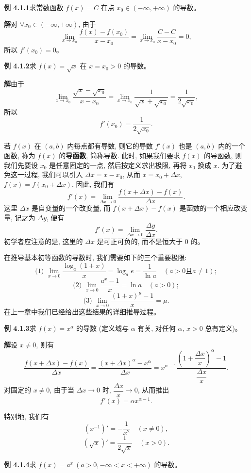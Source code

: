 \documentclass[UTF8,12pt,a4paper,fontset=fandol]{ctexart}
\begin{document}
\noindent\textbf{例 4.1.1}\quad 求常数函数 $f(x)=C$ 在点 $x_0\in(-\infty,+\infty)$ 的导数。

\noindent\textbf{解}\quad 对 $\forall x_0\in(-\infty,+\infty)$, 由于
\[
  \lim_{x\to x_0}\frac{f(x)-f(x_0)}{x-x_0}
  =
  \lim_{x\to x_0}\frac{C-C}{x-x_0}=0,
\]
所以 $f'(x_0)=0$。

\noindent\textbf{例 4.1.2}\quad 求 $f(x)=\sqrt{x}$ 在 $x=x_0>0$ 的导数。

\noindent\textbf{解}\quad 由于
\[
  \lim_{x\to x_0}\frac{\sqrt{x}-\sqrt{x_0}}{x-x_0}
  =
  \lim_{x\to x_0}\frac1{\sqrt{x}+\sqrt{x_0}}
  =
  \frac1{2\sqrt{x_0}},
\]
所以
\[
  f'(x_0)=\frac1{2\sqrt{x_0}}.
\]

若 $f(x)$ 在 $(a,b)$ 内每点都有导数, 则它的导数 $f'(x)$ 也是 $(a,b)$ 内的一个函数, 称为 $f(x)$ 的\textbf{导函数}, 简称导数. 此时, 如果我们要求 $f(x)$ 的导函数, 则我们先要设 $x_0$ 是任意固定的一点, 然后按定义求出极限, 再将 $x_0$ 换成 $x$. 为了避免这一过程, 我们可以引入 $\Delta x=x-x_0$, 从而 $x=x_0+\Delta x$, $f(x)=f(x_0+\Delta x)$. 因此, 我们有
\[
  f'(x)=
  \lim_{\Delta x\to0}\frac{f(x+\Delta x)-f(x)}{\Delta x}.
\]
这里 $\Delta x$ 是自变量的一个改变量, 而 $f(x+\Delta x)-f(x)$ 是函数的一个相应改变量, 记之为 $\Delta y$, 便有
\[
  f'(x)=\lim_{\Delta x\to0}\frac{\Delta y}{\Delta x}.
\]
初学者应注意的是, 这里的 $\Delta x$ 是可正可负的, 而不是恒大于 $0$ 的。

在推导基本初等函数的导数时, 我们需要如下的三个重要极限:
\[
  \text{(1) }\lim_{x\to0}\frac{\log_a(1+x)}{x}
  =
  \log_a e
  =
  \frac1{\ln a}\quad(a>0\text{且}a\ne1);
\]
\[
  \text{(2) }\lim_{x\to0}\frac{a^x-1}{x}
  =
  \ln a\quad(a>0);
\]
\[
  \text{(3) }\lim_{x\to0}\frac{(1+x)^\mu-1}{x}
  =
  \mu.
\]
在上一章中我们已经给出这些结果的详细推导过程。

\noindent\textbf{例 4.1.3}\quad 求 $f(x)=x^\alpha$ 的导数 (定义域与 $\alpha$ 有关, 对任何 $\alpha$, $x>0$ 总有定义)。

\noindent\textbf{解}\quad 设 $x\ne0$, 则有
\[
  \frac{f(x+\Delta x)-f(x)}{\Delta x}
  =
  \frac{(x+\Delta x)^\alpha-x^\alpha}{\Delta x}
  =
  x^{\alpha-1}
  \frac{\left(1+\dfrac{\Delta x}{x}\right)^\alpha-1}
       {\dfrac{\Delta x}{x}}.
\]
对固定的 $x\ne0$, 由于当 $\Delta x\to0$ 时, $\dfrac{\Delta x}{x}\to0$, 从而推出
\[
  f'(x)=\alpha x^{\alpha-1}.
\]

特别地, 我们有
\[
  (x^{-1})'=-\frac1{x^2}\quad(x\ne0),
\]
\[
  (\sqrt{x})'=\frac1{2\sqrt{x}}\quad(x>0).
\]

\noindent\textbf{例 4.1.4}\quad 求 $f(x)=a^x\ (a>0,-\infty<x<+\infty)$ 的导数。
\end{document}
